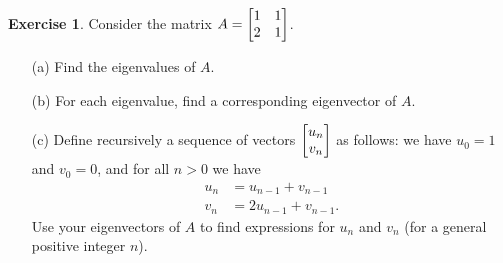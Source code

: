 \documentclass[a4paper]{amsart}
\theoremstyle{definition}
\newtheorem{exercise}{Exercise}
\begin{document}
\begin{exercise}\label{ex-diffeq-i}
 Consider the matrix $A=\left[\begin{matrix} 1 & 1 \\ 2 & 1 \end{matrix}\right]$.
 \begin{itemize}
  \item[(a)] Find the eigenvalues of $A$.
  \item[(b)] For each eigenvalue, find a corresponding eigenvector of
   $A$. 
  \item[(c)] Define recursively a sequence of vectors $\left[\begin{matrix}
   u_n\\v_n\end{matrix}\right]$ as follows: we have $u_0=1$ and $v_0=0$, and for all
   $n>0$ we have
   \begin{align*}
    u_n &= u_{n-1} + v_{n-1} \\
    v_n &= 2u_{n-1} + v_{n-1}.
   \end{align*}
   Use your eigenvectors of $A$ to find expressions for $u_n$ and
   $v_n$ (for a general positive integer $n$).
 \end{itemize}
\end{exercise}
\end{document}
